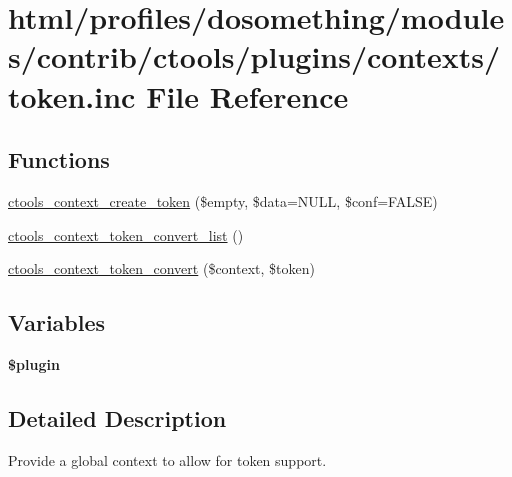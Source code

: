 \hypertarget{contexts_2token_8inc}{
\section{html/profiles/dosomething/modules/contrib/ctools/plugins/contexts/token.inc File Reference}
\label{contexts_2token_8inc}
}
\subsection*{Functions}
\begin{DoxyCompactItemize}
\item 
\hyperlink{contexts_2token_8inc_ab8eb1d3d654f1fde3224dc0d963d381c}{ctools\_\-context\_\-create\_\-token} (\$empty, \$data=NULL, \$conf=FALSE)
\item 
\hyperlink{contexts_2token_8inc_a7a253406a63a33265393b3468539a6f7}{ctools\_\-context\_\-token\_\-convert\_\-list} ()
\item 
\hyperlink{contexts_2token_8inc_ab50aa70da250bffd56e1948218a6b3c8}{ctools\_\-context\_\-token\_\-convert} (\$context, \$token)
\end{DoxyCompactItemize}
\subsection*{Variables}
\begin{DoxyCompactItemize}
\item 
{\bfseries \$plugin}
\end{DoxyCompactItemize}


\subsection{Detailed Description}
Provide a global context to allow for token support. 

